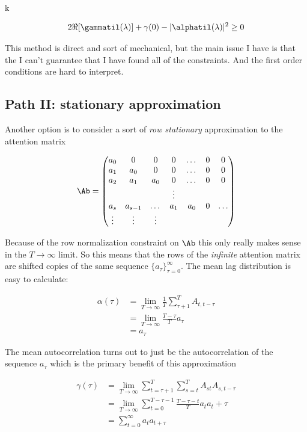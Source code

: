 k\documentclass{article}
\begin{document}
 \begin{equation}
     2 \Re[\gammatil(\lambda)] + \gamma(0) - |\alphatil(\lambda)|^2 \geq 0
 \end{equation}

 This method is direct and sort of mechanical, but the main issue I have is that the I can't guarantee that I have found all of the constraints. And the first order conditions are hard to interpret.

 \subsection{Path II: stationary approximation}
Another option is to consider a sort of \textit{row stationary} approximation to the attention matrix

\begin{equation}\label{astat}
    \Ab = \begin{pmatrix}
        a_0 & 0 & 0 & 0 & \dots  &0 &0\\
        a_1 &a_0 & 0 & 0 & \dots  &0 &0\\
        a_2 &a_1 & a_0 & 0 & \dots  &0 &0\\
        &&&\vdots & \\
        a_s & a_{s-1} & \dots & a_1 & a_0  & 0 & \dots \\
        \vdots & \vdots &\vdots 
    \end{pmatrix}
\end{equation}

 Because of the row normalization constraint on $\Ab$ this only really makes sense in the $T \to \infty$ limit. So this means that the rows of the \textit{infinite} attention matrix are shifted copies of the same sequence $\{a_\tau\}_{\tau=0}^\infty$. The mean lag distribution is easy to calculate:

 \begin{align}
     \alpha(\tau)  &= \lim_{T\to \infty}\frac{1}{T}\sum_{\tau+1}^T A_{t, t-\tau} \\ 
     &= \lim_{T\to \infty}\frac{T - \tau}{T} a_\tau \\
     &= a_\tau
 \end{align}

The mean autocorrelation turns out to just be the autocorrelation of the sequence $a_\tau$ which is the primary benefit of this approximation 

\begin{align}
    \gamma(\tau) &= \lim_{T\to \infty}\sum_{t=\tau+1}^T\sum_{s=t}^T A_{st}A_{s,t-\tau} \\
    &= \lim_{T \to \infty}\sum_{t=0}^{T-\tau-1}\frac{T-\tau-t}{T}a_ta_t+\tau \\
    &= \sum_{t=0}^\infty a_t a_{t+\tau} 
\end{align}
\end{document}
